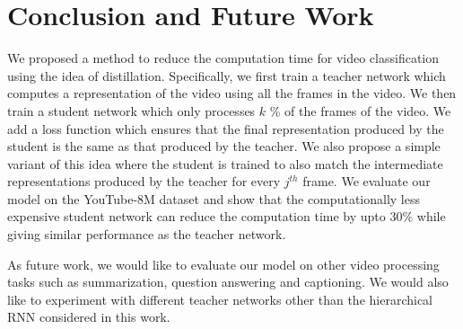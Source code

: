 \documentclass[10pt,twocolumn,letterpaper]{article}
\begin{document}
\section{Conclusion and Future Work}
We proposed a method to reduce the computation time for video classification using the idea of distillation. Specifically, we first train a teacher network which computes a representation of the video using all the frames in the video. We then train a student network which only processes $k$ \% of the frames of the video. We add a loss function which ensures that the final representation produced by the student is the same as that produced by the teacher. We also propose a simple variant of this idea where the student is trained to also match the intermediate representations produced by the teacher for every $j^{th}$ frame. We evaluate our model on the YouTube-8M dataset and show that the computationally less expensive student network can reduce the computation time by upto $30\%$ while giving similar performance as the teacher network. 

As future work, we would like to evaluate our model on other video processing tasks such as summarization, question answering and captioning. We would also like to experiment with different teacher networks other than the hierarchical RNN considered in this work.





{\small


}
\end{document}
